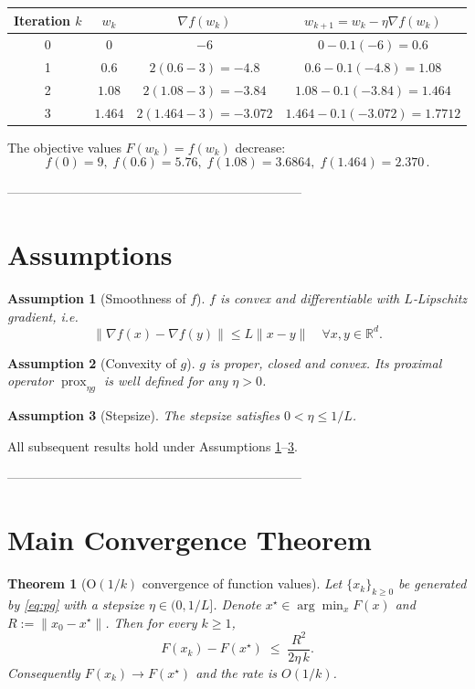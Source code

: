 \documentclass{article}
\newtheorem{theorem}{Theorem}
\newtheorem{assumption}{Assumption}
\newcommand{\prox}{\operatorname{prox}}
\newcommand{\R}{\mathbb{R}}
\begin{document}
\begin{center}
\begin{tabular}{c|c|c|c}
Iteration $k$ & $w_{k}$ & $\nabla f(w_{k})$ & $w_{k+1}=w_{k}-\eta\nabla f(w_{k})$\\ \hline
0 & $0$ & $-6$ & $0-0.1(-6)=0.6$\\
1 & $0.6$ & $2(0.6-3)=-4.8$ & $0.6-0.1(-4.8)=1.08$\\
2 & $1.08$ & $2(1.08-3)=-3.84$ & $1.08-0.1(-3.84)=1.464$\\
3 & $1.464$ & $2(1.464-3)=-3.072$ & $1.464-0.1(-3.072)=1.7712$
\end{tabular}
\end{center}
The objective values $F(w_{k})=f(w_{k})$ decrease:
\[
f(0)=9,\; f(0.6)=5.76,\; f(1.08)=3.6864,\; f(1.464)=2.370\,.
\]

---------------------------------------------------------------------

\section*{Assumptions}
\begin{assumption}[Smoothness of $f$]\label{as:lip}
$f$ is convex and differentiable with $L$‑Lipschitz gradient, i.e.
\[
\|\nabla f(x)-\nabla f(y)\|\le L\|x-y\|\quad\forall x,y\in\R^{d}.
\]
\end{assumption}
\begin{assumption}[Convexity of $g$]\label{as:conv}
$g$ is proper, closed and convex. Its proximal operator $\prox_{\eta g}$ is well defined for any $\eta>0$.
\end{assumption}
\begin{assumption}[Stepsize]\label{as:step}
The stepsize satisfies $0<\eta\le 1/L$.
\end{assumption}
All subsequent results hold under Assumptions \ref{as:lip}–\ref{as:step}.

---------------------------------------------------------------------

\section*{Main Convergence Theorem}
\begin{theorem}[O$(1/k)$ convergence of function values]\label{thm:rate}
Let $\{x_{k}\}_{k\ge0}$ be generated by \eqref{eq:pg} with a stepsize $\eta\in(0,1/L]$.
Denote $x^{\star}\in\arg\min_{x}F(x)$ and $R:=\|x_{0}-x^{\star}\|$.
Then for every $k\ge1$,
\begin{equation}
F(x_{k})-F(x^{\star})\;\le\;\frac{R^{2}}{2\eta\,k}.
\label{eq:rate}
\end{equation}
Consequently $F(x_{k})\to F(x^{\star})$ and the rate is $O(1/k)$.
\end{theorem}
\end{document}
